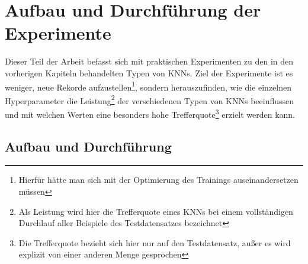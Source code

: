 \documentclass[
	a4paper,
	12pt,
	ngerman,
	oneside
]{scrreprt}											%
\begin{document}
	
	
	
	\chapter{Aufbau und Durchführung der Experimente} \label{Experimente}
		Dieser Teil der Arbeit befasst sich mit praktischen Experimenten zu den in den vorherigen Kapiteln behandelten Typen von KNNs. Ziel der Experimente ist es weniger, neue Rekorde aufzustellen\footnote{Hierfür hätte man sich mit der Optimierung des Trainings auseinandersetzen müssen}, sondern herauszufinden, wie die einzelnen Hyperparameter die Leistung\footnote{Als Leistung wird hier die Trefferquote eines KNNs bei einem vollständigen Durchlauf aller Beispiele des Testdatensatzes bezeichnet} der verschiedenen Typen von KNNs beeinflussen und mit welchen Werten eine besonders hohe Trefferquote\footnote{Die Trefferquote bezieht sich hier nur auf den Testdatensatz, außer es wird explizit von einer anderen Menge gesprochen} erzielt werden kann. 
		
	

		\section{Aufbau und Durchführung}
\end{document}
